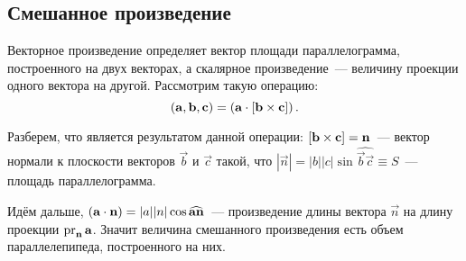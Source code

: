 \subsection{Смешанное произведение}
\label{sec:triple}
\begin{wrapfigure}{r}{0.35\tw}
    \centering
    \vspace{-1pc}
    \caption{}
    \label{pic:math-triple}
\end{wrapfigure}

Векторное произведение определяет вектор площади параллелограмма, построенного на двух векторах, а скалярное произведение~--- величину проекции одного вектора на другой. Рассмотрим такую операцию:
\begin{equation}
    \left( \mathbf{a}, \mathbf{b}, \mathbf{c} \right) = \left(\mathbf{a} \cdot \mathbf{\left[\mathbf{b} \times \mathbf{c}\right]}\right).
\end{equation}

Разберем, что является результатом данной операции: $\left[\mathbf{b} \times \mathbf{c}\right] = \mathbf{n}$~--- вектор нормали к плоскости векторов $\vec{b}$ и $\vec{c}$ такой, что $|\vec{n}| = |b||c| \sin \widehat{\vec{b}\vec{c}} \equiv S$~--- площадь параллелограмма.

Идём дальше, $\left(\mathbf{a} \cdot \mathbf{n}\right) = |a||n|\cos \widehat{\mathbf{a} \mathbf{n}}$~--- произведение длины вектора $\vec{n}$ на длину проекции $\operatorname{pr}_{\mathbf{n}} \mathbf{a}$. Значит величина смешанного произведения есть объем параллелепипеда, построенного на них.


